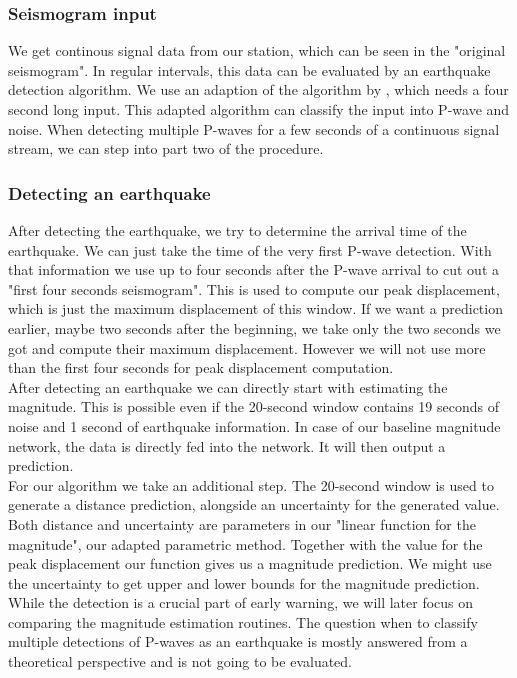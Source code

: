 \documentclass[thesis.tex]{subfiles}
\begin{document}
 \subsubsection{Seismogram input}
 We get continous signal data from our station, which can be seen in the "original seismogram". In regular intervals, this data can be evaluated by an earthquake detection algorithm. We use an adaption of the algorithm by \cite{ross2018generalized}, which needs a four second long input. This adapted algorithm can classify the input into P-wave and noise. When detecting multiple P-waves for a few seconds of a continuous signal stream, we can step into part two of the procedure. \\
 \subsubsection{Detecting an earthquake}
After detecting the earthquake, we try to determine the arrival time of the earthquake. We can just take the time of the very first P-wave detection. With that information we use up to four seconds after the P-wave arrival to cut out a "first four seconds seismogram". This is used to compute our peak displacement, which is just the maximum displacement of this window. If we want a prediction earlier, maybe two seconds after the beginning, we take only the two seconds we got and compute their maximum displacement. However we will not use more than the first four seconds for peak displacement computation.\\
After detecting an earthquake we can directly start with estimating the magnitude. This is possible even if the 20-second window contains 19 seconds of noise and 1 second of earthquake information. In case of our baseline magnitude network, the data is directly fed into the network. It will then output a prediction.\\
For our algorithm we take an additional step. The 20-second window is used to generate a distance prediction, alongside an uncertainty for the generated value. Both distance and uncertainty are parameters in our "linear function for the magnitude", our adapted parametric method. Together with the value for the peak displacement our function gives us a magnitude prediction. We might use the uncertainty to get upper and lower bounds for the magnitude prediction.\\
While the detection is a crucial part of early warning, we will later focus on comparing the magnitude estimation routines. The question when to classify multiple detections of P-waves as an earthquake is mostly answered from a theoretical perspective and is not going to be evaluated. 
\end{document}
